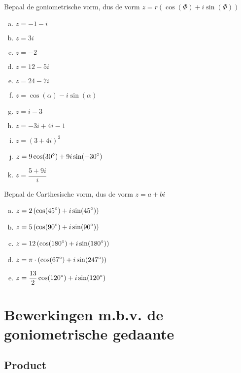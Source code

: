 \documentclass[12pt,twoside,a4paper]{article}
\begin{document}
\begin{oefening}
Bepaal de goniometrische vorm, dus de vorm $z=r(\cos(\Phi)+i\sin(\Phi))$
\begin{multicols}{2}
\begin{enumerate}[(a)]
  \itemsep.5em
  \item $\displaystyle z=-1-i$
  \item $\displaystyle z=3i$
  \item $\displaystyle z=-2$
  \item $\displaystyle z=12-5i$
  \item $\displaystyle z=24-7i$
  \item $\displaystyle z=\cos(\alpha)-i\sin(\alpha)$
  \item $\displaystyle z=i-3$
  \item $\displaystyle z=-3i+4i-1$
  \item $\displaystyle z=\left(3+4i\right)^2$
  \item $\displaystyle z=9\cos(30^\circ)+9i\sin(-30^\circ)$
  \item $\displaystyle z=\dfrac{5+9i}{i}$
\end{enumerate}
\end{multicols}
\end{oefening}

\begin{oefening}
Bepaal de Carthesische vorm, dus de vorm $z=a+bi$
\begin{enumerate}[(a)]
  \itemsep.5em
  \item $\displaystyle z=2\left(\cos(45^\circ)+i\sin(45^\circ)\right)$
  \item $\displaystyle z=5\left(\cos(90^\circ)+i\sin(90^\circ)\right)$
  \item $\displaystyle z=12\left(\cos(180^\circ)+i\sin(180^\circ)\right)$
  \item $\displaystyle z=\pi\cdot\left(\cos(67^\circ)+i\sin(247^\circ)\right)$
  \item $\displaystyle z=\dfrac{13}{2}\cos(120^\circ)+i\sin(120^\circ)$
\end{enumerate}
\end{oefening}

\cleardoublepage
\section{Bewerkingen m.b.v. de goniometrische gedaante}

\subsection{Product}
\end{document}
